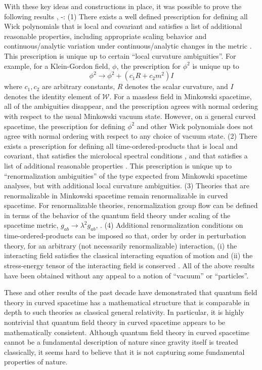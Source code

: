 With these key ideas and constructions in place, it was possible to
prove the following results \cite{hw1}, \cite{hw2}-\cite{hw4}: (1)
There exists a well defined prescription for defining all Wick
polynomials that is local and covariant and satisfies a list of
additional reasonable properties, including appropriate scaling
behavior and continuous/analytic variation under continuous/analytic
changes in the metric \cite{hw1}. This prescription is unique up to certain
``local curvature ambiguities''. For example, for a Klein-Gordon
field, $\phi$, the prescription for $\phi^2$ is unique up to
\begin{equation}
\phi^2 \rightarrow \phi^2 + (c_1 R + c_2 m^2) I 
\end{equation}
where $c_1, c_2$ are arbitrary constants, $R$ denotes the scalar
curvature, and $I$ denotes the identity element of $\mathcal W$. For a
massless field in Minkowski spacetime, all of the ambiguities
disappear, and the prescription agrees with normal ordering with
respect to the usual Minkowski vacuum state. However, on a general
curved spacetime, the prescription for defining $\phi^2$ and other
Wick polynomials does not agree with normal ordering with respect to
any choice of vacuum state. (2) There exists a prescription for
defining all time-ordered-products that is local and covariant, that
satisfies the microlocal spectral conditions \cite{bf}, and that
satisfies a list of additional reasonable properties \cite{hw2}. This
prescription is unique up to ``renormalization ambiguities'' of the
type expected from Minkowski spacetime analyses, but with additional
local curvature ambiguities. (3) Theories that are renormalizable in
Minkowski spacetime remain renormalizable in curved spacetime. For
renormalizable theories, renormalization group flow can be defined in
terms of the behavior of the quantum field theory under scaling of the
spacetime metric, $g_{ab} \rightarrow \lambda^2 g_{ab}$, \cite{hw3}.
(4) Additional renormalization conditions on time-ordered-products can
be imposed so that, order by order in perturbation theory, for an
arbitrary (not necessarily renormalizable) interaction, (i) the
interacting field satisfies the classical interacting equation of
motion and (ii) the stress-energy tensor of the interacting field is
conserved \cite{hw4}. All of the above results have been obtained
without any appeal to a notion of ``vacuum'' or ``particles''.

These and other results of the past decade have demonstrated that
quantum field theory in curved spacetime has a mathematical structure
that is comparable in depth to such theories as classical general
relativity. In particular, it is highly nontrivial that quantum field
theory in curved spacetime appears to be mathematically
consistent. Although quantum field theory in curved spacetime cannot
be a fundamental description of nature since gravity itself is treated
classically, it seems hard to believe that it is not capturing some
fundamental properties of nature.

